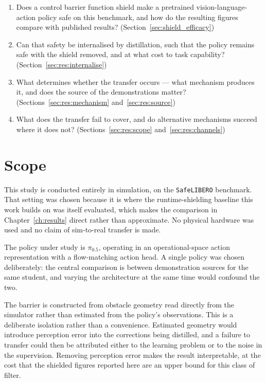 \documentclass[a4paper,11pt]{report}
\begin{document}
\begin{enumerate}[label=\textbf{RQ\arabic*.}, leftmargin=3.2em, topsep=3pt, itemsep=2pt, parsep=0pt]
  \item Does a control barrier function shield make a pretrained vision-language-action policy safe
        on this benchmark, and how do the resulting figures compare with published results?
        (Section~\ref{sec:shield_efficacy})
  \item Can that safety be internalised by distillation, such that the policy remains safe with the
        shield removed, and at what cost to task capability?
        (Section~\ref{sec:res:internalise})
  \item What determines whether the transfer occurs --- what mechanism produces it, and does the
        source of the demonstrations matter?
        (Sections~\ref{sec:res:mechanism} and~\ref{sec:res:source})
  \item What does the transfer fail to cover, and do alternative mechanisms succeed where it does
        not? (Sections~\ref{sec:res:scope} and~\ref{sec:res:channels})
\end{enumerate}

\section{Scope}\label{sec:intro:scope}

This study is conducted entirely in simulation, on the \texttt{SafeLIBERO} benchmark. That setting
was chosen because it is where the runtime-shielding baseline this work builds on was itself
evaluated, which makes the comparison in Chapter~\ref{ch:results} direct rather than approximate.
No physical hardware was used and no claim of sim-to-real transfer is made.

The policy under study is $\pi_{0.5}$, operating in an operational-space action representation with
a flow-matching action head. A single policy was chosen deliberately: the central comparison is
between demonstration sources for the same student, and varying the architecture at the same time
would confound the two.

The barrier is constructed from obstacle geometry read directly from the simulator rather than
estimated from the policy's observations. This is a deliberate isolation rather than a convenience.
Estimated geometry would introduce perception error into the corrections being distilled, and a
failure to transfer could then be attributed either to the learning problem or to the noise in the
supervision. Removing perception error makes the result interpretable, at the cost that the shielded
figures reported here are an upper bound for this class of filter.
\end{document}
